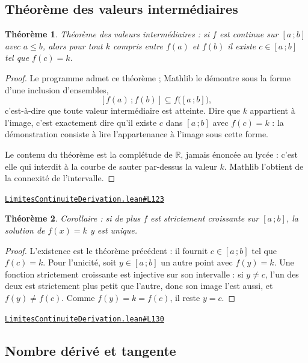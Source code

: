 \documentclass[11pt,a4paper]{article}
\theoremstyle{definition}
\theoremstyle{plain}
\newtheorem{theoreme}{Théorème}
\newcommand{\source}[2]{\par\smallskip\noindent\hfill{\footnotesize\href{#1}{\texttt{#2}}}\par\smallskip}
\begin{document}
\subsection{Théorème des valeurs intermédiaires}

\begin{theoreme}
Théorème des valeurs intermédiaires : si $f$ est continue sur $[a\,;b]$ avec $a \le b$,
alors pour tout $k$ compris entre $f(a)$ et $f(b)$ il existe $c \in [a\,;b]$ tel que
$f(c) = k$.
\end{theoreme}

\begin{proof}
Le programme admet ce théorème ; Mathlib le démontre sous la forme d'une inclusion
d'ensembles,
\[ [f(a)\,;f(b)] \subseteq f\bigl([a\,;b]\bigr) , \]
c'est-à-dire que toute valeur intermédiaire est atteinte. Dire que $k$ appartient à
l'image, c'est exactement dire qu'il existe $c$ dans $[a\,;b]$ avec $f(c) = k$ : la
démonstration consiste à lire l'appartenance à l'image sous cette forme.

\medskip\noindent
Le contenu du théorème est la complétude de $\mathbb{R}$, jamais énoncée au lycée : c'est
elle qui interdit à la courbe de \og{} sauter \fg{} par-dessus la valeur $k$. Mathlib
l'obtient de la connexité de l'intervalle.
\end{proof}
\source{https://github.com/Commutator-IO/learn-lean/blob/main/cours/02-lycee/04-limites-continuite-derivation/LimitesContinuiteDerivation.lean\#L123}{LimitesContinuiteDerivation.lean\#L123}

\begin{theoreme}
Corollaire : si de plus $f$ est strictement croissante sur $[a\,;b]$, la solution de
$f(x) = k$ y est unique.
\end{theoreme}

\begin{proof}
L'existence est le théorème précédent : il fournit $c \in [a\,;b]$ tel que $f(c) = k$.
Pour l'unicité, soit $y \in [a\,;b]$ un autre point avec $f(y) = k$. Une fonction
strictement croissante est injective sur son intervalle : si $y \ne c$, l'un des deux est
strictement plus petit que l'autre, donc son image l'est aussi, et $f(y) \ne f(c)$. Comme
$f(y) = k = f(c)$, il reste $y = c$.
\end{proof}
\source{https://github.com/Commutator-IO/learn-lean/blob/main/cours/02-lycee/04-limites-continuite-derivation/LimitesContinuiteDerivation.lean\#L130}{LimitesContinuiteDerivation.lean\#L130}

\subsection{Nombre dérivé et tangente}
\end{document}
